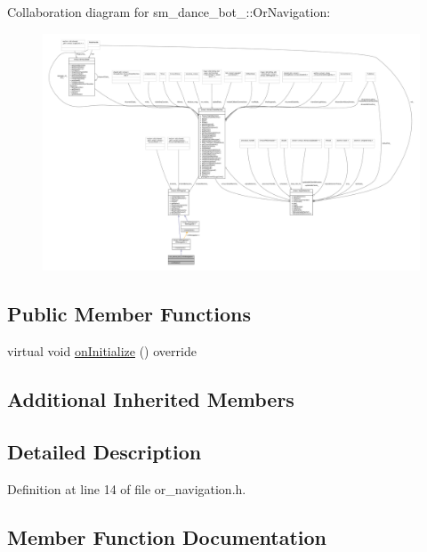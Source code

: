 Collaboration diagram for sm\+\_\+dance\+\_\+bot\+\_\+:\+:Or\+Navigation\+:
\nopagebreak
\begin{figure}[H]
\begin{center}
\leavevmode
\includegraphics[width=350pt]{classsm__dance__bot__2_1_1OrNavigation__coll__graph}
\end{center}
\end{figure}
\subsection*{Public Member Functions}
\begin{DoxyCompactItemize}
\item 
virtual void \hyperlink{classsm__dance__bot__2_1_1OrNavigation_acc491d801e0abacd9d152e048e77fab6}{on\+Initialize} () override
\end{DoxyCompactItemize}
\subsection*{Additional Inherited Members}


\subsection{Detailed Description}


Definition at line 14 of file or\+\_\+navigation.\+h.



\subsection{Member Function Documentation}

